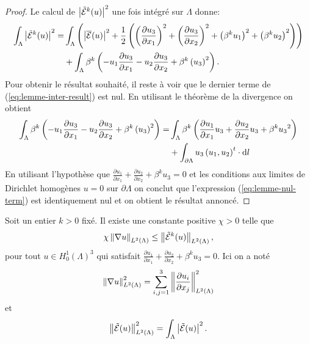 \begin{proof}
  Le calcul de $\left\lvert \tilde{\mathcal E}^k(u) \right\rvert^2$ une fois
  intégré sur $\Lambda$ donne:
  \begin{align}
    \int_\Lambda \left\lvert \tilde{\mathcal E}^k(u) \right\rvert^2 =
    &\int_\Lambda \left( \left\lvert \overline{\mathcal E}(u) \right\rvert^2
    + \frac{1}{2}\left( 
      \left( \frac{\partial u_3}{\partial x_1} \right)^2
      + \left( \frac{\partial u_3}{\partial x_2} \right)^2
      + \left( \beta^k u_1 \right)^2
      + \left( \beta^k u_2 \right)^2 \right) \right)\nonumber\\
    &+ \int_\Lambda \beta^k\left( 
      - u_1 \frac{\partial u_3}{\partial x_1}
      - u_2 \frac{\partial u_3}{\partial x_2}
      + \beta^k\left( u_3 \right)^2
     \right).\label{eq:lemme-inter-result}
  \end{align}
  Pour obtenir le résultat souhaité, il reste à voir que le
  dernier terme de (\ref{eq:lemme-inter-result}) est nul.
  En utilisant le théorème de la divergence on obtient
  \begin{align}
    \int_\Lambda \beta^k\left( 
      - u_1 \frac{\partial u_3}{\partial x_1}
      - u_2 \frac{\partial u_3}{\partial x_2}
      + \beta^k\left( u_3 \right)^2 \right) =
    &\int_\Lambda\beta^k\left( 
        \frac{\partial u_1}{\partial x_1}u_3
      + \frac{\partial u_2}{\partial x_2}u_3 +
      \beta^k{u_3}^2 \right)\\
    &+ \int_{\partial \Lambda} u_3\left( u_1,
      u_2 \right)^t\cdot\mathrm dl\label{eq:lemme-nul-term}
  \end{align}
  En utilisant l'hypothèse que $\frac{\partial u_1}{\partial x_1} +
  \frac{\partial u_2}{\partial x_2} + \beta^k u_3 = 0$ et les
  conditions aux limites de Dirichlet homogènes $u = 0$ sur
  $\partial \Lambda$ on conclut que l'expression
  (\ref{eq:lemme-nul-term}) est identiquement nul et on obtient le
  résultat annoncé.
\end{proof}

\begin{lemme}\label{lem:2}
  Soit un entier $k > 0$ fixé. Il existe une constante positive $\chi >
  0$ telle que
  \begin{equation}
\chi \left\lVert \nabla u \right\rVert_{L^2(\Lambda)} \leq
\left\lVert \tilde{\mathcal E}^k(u) \right\rVert_{L^2(\Lambda)},
  \end{equation}
  pour tout $u \in H^1_0(\Lambda)^3$ qui satisfait $\frac{\partial
    u_1}{\partial x_1} + \frac{\partial u_2}{\partial x_2} +
  \beta^k u_3 = 0$. Ici on a noté
  \begin{equation}
    \left\lVert \nabla u \right\rVert_{L^2(\Lambda)}^2 = \sum_{i,j = 1}^3 \left\lVert \frac{\partial u_i}{\partial x_j} \right\rVert^2_{L^2(\Lambda)}
  \end{equation}
  et
  \begin{equation}
    \left\lVert \tilde{\mathcal E}(u) \right\rVert^2_{L^2(\Lambda)} = \int_\Lambda \left\lvert \tilde{\mathcal E}(u) \right\rvert^2.
  \end{equation}
\end{lemme}

